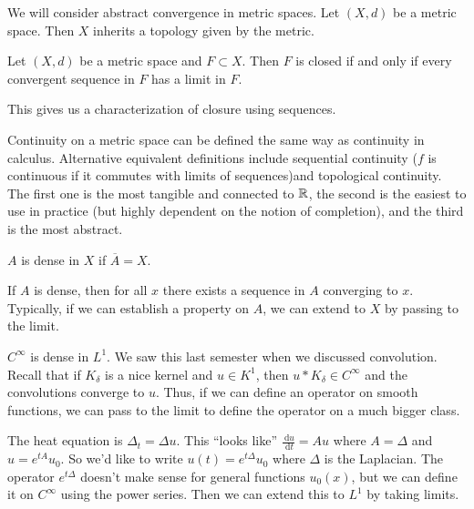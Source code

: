 \documentclass[10pt, twoside]{article}
\renewcommand{\d}{\ \mathrm{d}}
\begin{document}
    We will consider abstract convergence in metric spaces. Let $(X,d)$ be a
    metric space. Then $X$ inherits a topology given by the metric. 

    \begin{lem} Let $(X,d)$ be a metric space and $F \subset X$. Then $F$ is
    closed if and only if every convergent sequence in $F$ has a limit in $F$.
\end{lem}

    This gives us a characterization of closure using sequences.

    \begin{exm}[Continuity] Continuity on a metric space can be defined the
        same way as continuity in calculus. Alternative equivalent definitions
        include sequential continuity ($f$ is continuous if it commutes with
        limits of sequences)and topological continuity. The first one is the
        most tangible and connected to $\mathbb{R}$, the second is the easiest to use
        in practice (but highly dependent on the notion of completion), and the
        third is the most abstract.  \end{exm}

    \begin{defn}[Density] $A$ is dense in $X$ if $\overline{A} = X$.
    \end{defn}

    \begin{rmk} If $A$ is dense, then for all $x$ there exists a sequence in
    $A$ converging to $x$. Typically, if we can establish a property on $A$, we
can extend to $X$ by passing to the limit.  \end{rmk}

    \begin{exm} $C^{\infty}$ is dense in $L^1$. We saw this last semester when
        we discussed convolution. Recall that if $K_{\delta}$ is a nice kernel
        and $u \in K^1$, then $u * K_{\delta} \in C^{\infty}$ and the
        convolutions converge to $u$. Thus, if we can define an operator on
        smooth functions, we can pass to the limit to define the operator on a
        much bigger class.  \end{exm}

    \begin{exm} The heat equation is $\Delta_t = \Delta u$. This
        ``looks like'' $\frac{\d u}{\d t} = Au$ where $A = \Delta$ and
        $u=e^{tA}u_0$. So we'd like to write $u(t) = e^{t\Delta}u_0$ where
        $\Delta $ is the Laplacian. The operator $e^{t\Delta}$ doesn't make
        sense for general functions $u_0(x)$, but we can define it on
        $C^{\infty}$ using the power series. Then we can extend this to $L^1$
        by taking limits.  \end{exm}
\end{document}

